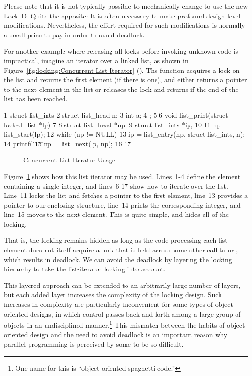 Please note that it is not typically possible to mechanically
change  to use the new Lock~D.
Quite the opposite: It is often necessary to make profound design-level
modifications.
Nevertheless, the effort required for such modifications is normally
a small price to pay in order to avoid deadlock.

For another example where releasing all locks before invoking unknown
code is impractical, imagine an iterator over a linked list, as shown in
Figure~\ref{fig:locking:Concurrent List Iterator} ().
The  function acquires a lock on the list and returns
the first element (if there is one), and
 either returns a pointer to the next element in the list
or releases the lock and returns  if the end of the list has
been reached.

{ \scriptsize
\begin{verbbox}
  1 struct list_ints {
  2   struct list_head n;
  3   int a;
  4 };
  5 
  6 void list_print(struct locked_list *lp)
  7 {
  8   struct list_head *np;
  9   struct list_ints *ip;
 10 
 11   np = list_start(lp);
 12   while (np != NULL) {
 13     ip = list_entry(np, struct list_ints, n);
 14     printf("\t%
 15     np = list_next(lp, np);
 16   }
 17 }
\end{verbbox}
}
\begin{figure}[tbp]
\centering
\theverbbox
\caption{Concurrent List Iterator Usage}
\label{fig:locking:Concurrent List Iterator Usage}
\end{figure}

Figure~\ref{fig:locking:Concurrent List Iterator Usage} shows how
this list iterator may be used.
Lines~1-4 define the  element containing a single integer,
and lines~6-17 show how to iterate over the list.
Line~11 locks the list and fetches a pointer to the first element,
line~13 provides a pointer to our enclosing  structure,
line~14 prints the corresponding integer, and
line~15 moves to the next element.
This is quite simple, and hides all of the locking.

That is, the locking remains hidden as long as the code processing each
list element does not itself acquire a lock that is held across some
other call to  or , which results in
deadlock.
We can avoid the deadlock by layering the locking hierarchy
to take the list-iterator locking into account.

This layered approach can be extended to an arbitrarily large number of layers,
but each added layer increases the complexity of the locking design.
Such increases in complexity are particularly inconvenient for some
types of object-oriented designs, in which control passes back and forth
among a large group of objects in an undisciplined manner.\footnote{
	One name for this is ``object-oriented spaghetti code.''}
This mismatch between the habits of object-oriented design and the
need to avoid deadlock is an important reason why parallel programming
is perceived by some to be so difficult.

